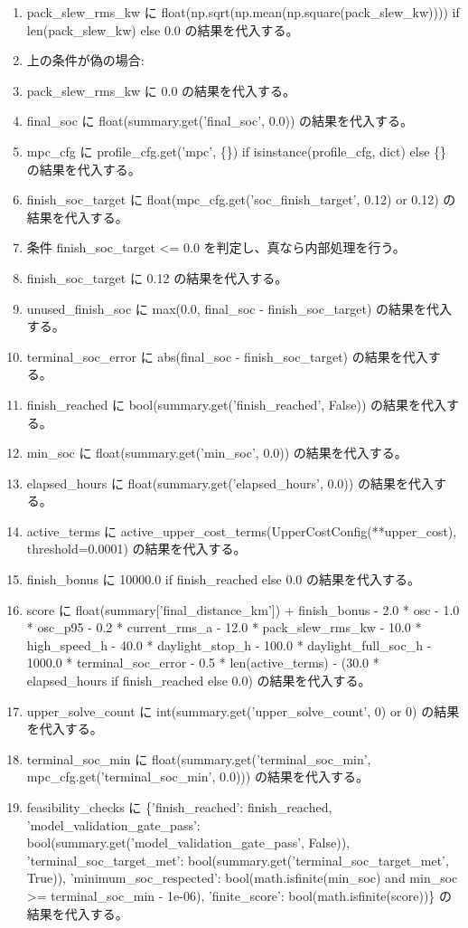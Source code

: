 \documentclass[a4paper,11pt]{article}
\begin{document}
\begin{enumerate}[leftmargin=1.8em]
\item   pack\_slew\_rms\_kw に float(np.sqrt(np.mean(np.square(pack\_slew\_kw)))) if len(pack\_slew\_kw) else 0.0 の結果を代入する。
\item   上の条件が偽の場合:
\item   pack\_slew\_rms\_kw に 0.0 の結果を代入する。
\item final\_soc に float(summary.get('final\_soc', 0.0)) の結果を代入する。
\item mpc\_cfg に profile\_cfg.get('mpc', \{\}) if isinstance(profile\_cfg, dict) else \{\} の結果を代入する。
\item finish\_soc\_target に float(mpc\_cfg.get('soc\_finish\_target', 0.12) or 0.12) の結果を代入する。
\item 条件 finish\_soc\_target <= 0.0 を判定し、真なら内部処理を行う。
\item   finish\_soc\_target に 0.12 の結果を代入する。
\item unused\_finish\_soc に max(0.0, final\_soc - finish\_soc\_target) の結果を代入する。
\item terminal\_soc\_error に abs(final\_soc - finish\_soc\_target) の結果を代入する。
\item finish\_reached に bool(summary.get('finish\_reached', False)) の結果を代入する。
\item min\_soc に float(summary.get('min\_soc', 0.0)) の結果を代入する。
\item elapsed\_hours に float(summary.get('elapsed\_hours', 0.0)) の結果を代入する。
\item active\_terms に active\_upper\_cost\_terms(UpperCostConfig(**upper\_cost), threshold=0.0001) の結果を代入する。
\item finish\_bonus に 10000.0 if finish\_reached else 0.0 の結果を代入する。
\item score に float(summary['final\_distance\_km']) + finish\_bonus - 2.0 * osc - 1.0 * osc\_p95 - 0.2 * current\_rms\_a - 12.0 * pack\_slew\_rms\_kw - 10.0 * high\_speed\_h - 40.0 * daylight\_stop\_h - 100.0 * daylight\_full\_soc\_h - 1000.0 * terminal\_soc\_error - 0.5 * len(active\_terms) - (30.0 * elapsed\_hours if finish\_reached else 0.0) の結果を代入する。
\item upper\_solve\_count に int(summary.get('upper\_solve\_count', 0) or 0) の結果を代入する。
\item terminal\_soc\_min に float(summary.get('terminal\_soc\_min', mpc\_cfg.get('terminal\_soc\_min', 0.0))) の結果を代入する。
\item feasibility\_checks に \{'finish\_reached': finish\_reached, 'model\_validation\_gate\_pass': bool(summary.get('model\_validation\_gate\_pass', False)), 'terminal\_soc\_target\_met': bool(summary.get('terminal\_soc\_target\_met', True)), 'minimum\_soc\_respected': bool(math.isfinite(min\_soc) and min\_soc >= terminal\_soc\_min - 1e-06), 'finite\_score': bool(math.isfinite(score))\} の結果を代入する。

\end{enumerate}
\end{document}
